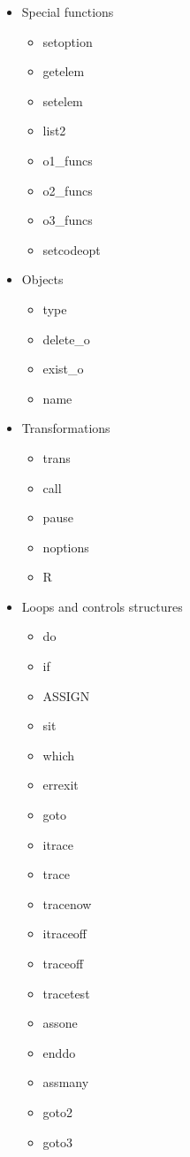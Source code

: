 \begin{itemize}
\item Special functions
\begin{itemize}
\item setoption
\item getelem
\item setelem
\item list2
\item o1\_funcs
\item o2\_funcs
\item o3\_funcs
\item setcodeopt
\end{itemize}
\item  Objects
\begin{itemize}

\item type
\item delete\_o
\item exist\_o
\item name
\end{itemize}
\item 	Transformations
\begin{itemize}
\item trans
\item call
\item pause
\item noptions
\item R
\end{itemize}

\item  Loops and controls structures
\begin{itemize}
\item do
\item if
\item ASSIGN
\item sit
\item which
\item errexit
\item goto
\item itrace
\item trace
\item tracenow
\item itraceoff
\item traceoff
\item tracetest
\item assone
\item enddo
\item assmany
\item goto2
\item goto3
\end{itemize}


\end{itemize}
